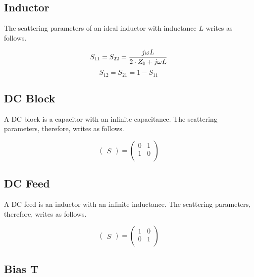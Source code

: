 \documentclass[10pt]{report}
\begin{document}
\subsection{Inductor}

The scattering parameters of an ideal inductor with inductance $L$
writes as follows.

\begin{equation}
S_{11} = S_{22} = \frac{j\omega L}{2\cdot Z_0 + j\omega L} \\
\end{equation}
\begin{equation}
S_{12} = S_{21} = 1-S_{11}
\end{equation}

\subsection{DC Block}

A DC block is a capacitor with an infinite capacitance.  The
scattering parameters, therefore, writes as follows.

\begin{equation}
\begin{pmatrix}
S
\end{pmatrix}
=
\begin{pmatrix}
0 & 1\\
1 & 0\\
\end{pmatrix}
\end{equation}

\subsection{DC Feed}

A DC feed is an inductor with an infinite inductance.  The scattering
parameters, therefore, writes as follows.

\begin{equation}
\begin{pmatrix}
S
\end{pmatrix}
=
\begin{pmatrix}
1 & 0\\
0 & 1\\
\end{pmatrix}
\end{equation}

\subsection{Bias T}
\end{document}
